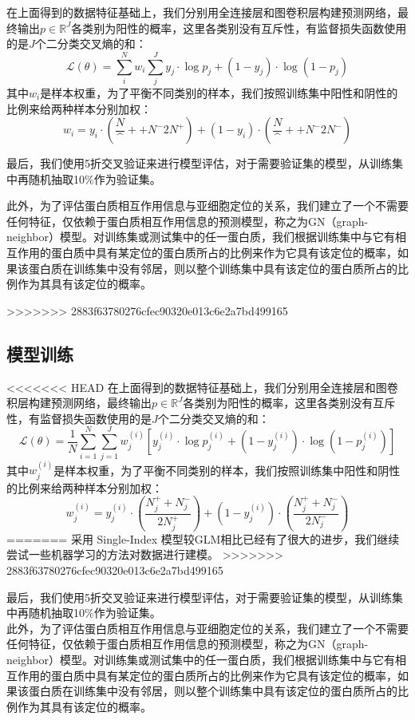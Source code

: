 \documentclass[a4paper,UTF8]{article}
\begin{document}
在上面得到的数据特征基础上，我们分别用全连接层和图卷积层构建预测网络，最终输出$p \in \mathbb R^J$各类别为阳性的概率，这里各类别没有互斥性，有监督损失函数使用的是$J$个二分类交叉熵的和：
$$\mathcal L(\theta) = \sum_i^N w_i \sum_j^{J} y_j\cdot \log p_j + (1-y_j)\cdot \log (1-p_j) $$
其中$w_i$是样本权重，为了平衡不同类别的样本，我们按照训练集中阳性和阴性的比例来给两种样本分别加权：
$$w_i=y_i \cdot (\frac N^++N^- 2N^+) + (1-y_i) \cdot (\frac N^++N^- 2N^-)$$

最后，我们使用5折交叉验证来进行模型评估，对于需要验证集的模型，从训练集中再随机抽取10\%作为验证集。

此外，为了评估蛋白质相互作用信息与亚细胞定位的关系，我们建立了一个不需要任何特征，仅依赖于蛋白质相互作用信息的预测模型，称之为GN（graph-neighbor）模型。对训练集或测试集中的任一蛋白质，我们根据训练集中与它有相互作用的蛋白质中具有某定位的蛋白质所占的比例来作为它具有该定位的概率，如果该蛋白质在训练集中没有邻居，则以整个训练集中具有该定位的蛋白质所占的比例作为其具有该定位的概率。

>>>>>>> 2883f63780276cfec90320e013c6e2a7bd499165

\subsection{模型训练}

<<<<<<< HEAD
在上面得到的数据特征基础上，我们分别用全连接层和图卷积层构建预测网络，最终输出$p \in \mathbb R^J$各类别为阳性的概率，这里各类别没有互斥性，有监督损失函数使用的是$J$个二分类交叉熵的和：
$$\mathcal L(\theta) = \frac{1}{N} \sum_{i=1}^N \sum_{j=1}^{J} w_j^{(i)} [y_j^{(i)}\cdot \log p_j^{(i)} + (1-y_j^{(i)})\cdot \log (1-p_j^{(i)})] $$
其中$w_j^{(i)}$是样本权重，为了平衡不同类别的样本，我们按照训练集中阳性和阴性的比例来给两种样本分别加权：
$$w_j^{(i)}=y_j^{(i)} \cdot (\frac {N_j^+ + N_j^-} {2N_j^+}) + (1-y_j^{(i)}) \cdot (\frac {N_j^+ +N_j^-} {2N_j^-})$$
=======
采用 Single-Index 模型较GLM相比已经有了很大的进步，我们继续尝试一些机器学习的方法对数据进行建模。
>>>>>>> 2883f63780276cfec90320e013c6e2a7bd499165

最后，我们使用5折交叉验证来进行模型评估，对于需要验证集的模型，从训练集中再随机抽取10\%作为验证集。\\

此外，为了评估蛋白质相互作用信息与亚细胞定位的关系，我们建立了一个不需要任何特征，仅依赖于蛋白质相互作用信息的预测模型，称之为GN（graph-neighbor）模型。对训练集或测试集中的任一蛋白质，我们根据训练集中与它有相互作用的蛋白质中具有某定位的蛋白质所占的比例来作为它具有该定位的概率，如果该蛋白质在训练集中没有邻居，则以整个训练集中具有该定位的蛋白质所占的比例作为其具有该定位的概率。
\end{document}
